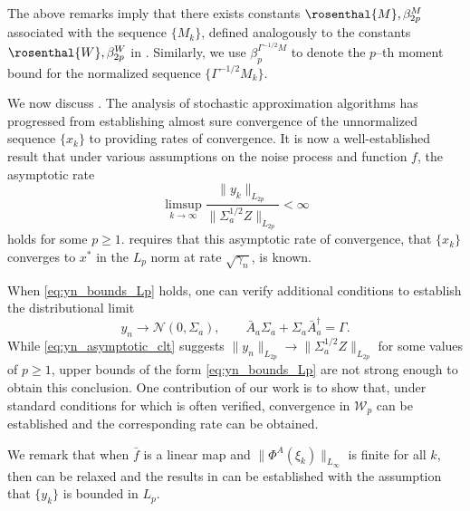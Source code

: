 \documentclass[11pt]{article}
\begin{document}
The above remarks imply that there exists constants $\rosenthal{M}, \beta_{2p}^M$ associated with the sequence $\{M_k\}$, defined analogously to the constants $\rosenthal{W}, \beta_{2p}^W$ in . 
Similarly, we use $\beta_p^{\Gamma^{-1/2}M}$ to denote the $p$--th moment bound for the normalized sequence $\{\Gamma^{-1/2}M_k\}$. 








We now discuss .
The analysis of stochastic approximation algorithms has progressed from establishing almost sure convergence of the unnormalized sequence $\{x_k\}$ to providing rates of convergence. 
It is now a well-established result \citep{gerencser1992rate,kushner_yin,borkar25} that under various assumptions on the noise process and function $f$, the asymptotic rate
\begin{equation}\label{eq:yn_bounds_Lp}
    \limsup_{k \to \infty} \frac{\lVert y_k \rVert_{L_{2p}}}{\lVert \Sigma_a^{1/2} Z \rVert_{L_{2p}}} < \infty
\end{equation}
holds for some $p \geq 1$. 
 requires that this asymptotic rate of convergence, that $\{x_k\}$ converges to $x^*$ in the $L_p$ norm at rate $\sqrt{\gamma_n}$, is known.



When \eqref{eq:yn_bounds_Lp} holds, one can verify additional conditions to establish the distributional limit
\begin{equation}\label{eq:yn_asymptotic_clt}
    y_n \to \mathcal{N}(0, \Sigma_a), \qquad \bar{A}_a \Sigma_a + \Sigma_a \bar{A}_a^\dagger = \Gamma .
\end{equation}
While \eqref{eq:yn_asymptotic_clt} suggests $\lVert y_n \rVert_{L_{2p}} \to \lVert \Sigma_a^{1/2} Z \rVert_{L_{2p}}$ for some values of $p \geq 1$, upper bounds of the form \eqref{eq:yn_bounds_Lp} are not strong enough to obtain this conclusion. 
One contribution of our work is to show that, under standard conditions for which  is often verified, convergence in $\mathcal{W}_p$ can be established and the corresponding rate can be obtained. 



We remark that when $\bar{f}$ is a linear map and $\lVert \Phi^A (\xi_k) \rVert_{L_\infty}$ is finite for all $k$, then  can be relaxed and the results in  can be established with the assumption that $\{y_k\}$ is bounded in $L_p$.
\end{document}
